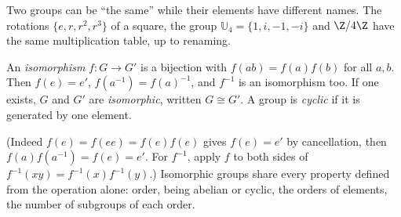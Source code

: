 Two groups can be ``the same'' while their elements have different names. The rotations $\{e,r,r^2,r^3\}$ of a square, the group $\mathbb U_4=\{1,i,-1,-i\}$ and $\Z/4\Z$ have the same multiplication table, up to renaming.

\begin{definition}
An \emph{isomorphism} $f:G\to G'$ is a bijection with $f(ab)=f(a)f(b)$ for all $a,b$. Then $f(e)=e'$, $f(a^{-1})=f(a)^{-1}$, and $f^{-1}$ is an isomorphism too. If one exists, $G$ and $G'$ are \emph{isomorphic}, written $G\cong G'$. A group is \emph{cyclic} if it is generated by one element.
\end{definition}

(Indeed $f(e)=f(ee)=f(e)f(e)$ gives $f(e)=e'$ by cancellation, then $f(a)f(a^{-1})=f(e)=e'$. For $f^{-1}$, apply $f$ to both sides of $f^{-1}(xy)=f^{-1}(x)f^{-1}(y)$.) Isomorphic groups share every property defined from the operation alone: order, being abelian or cyclic, the orders of elements, the number of subgroups of each order.

